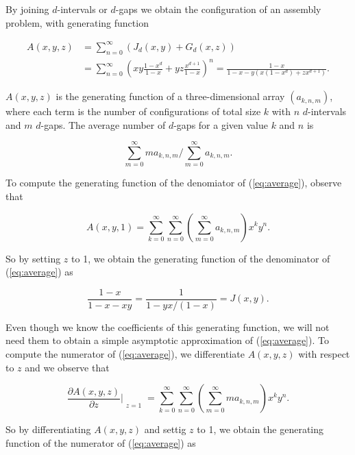 \documentclass{article}
\begin{document}
By joining $d$-intervals or $d$-gaps we obtain the configuration of an
assembly problem, with generating function

\begin{equation*}
\begin{split}
A(x,y,z) &= \sum_{n=0}^\infty \left(J_d(x,y) + G_d(x,z) \right) \\
&= \sum_{n=0}^\infty \left(xy\frac{1-x^d}{1-x} +
yz\frac{x^{d+1}}{1-x}\right)^n =
\frac{1-x}{1-x-y\left(x(1-x^d) +zx^{d+1}\right)}.
\end{split}
\end{equation*}

$A(x,y,z)$ is the generating function of a three-dimensional array
$(a_{k,n,m})$, where each term is the number of configurations of total
size $k$ with $n$ $d$-intervals and $m$ $d$-gaps. The average number of
$d$-gaps for a given value $k$ and $n$ is

\begin{equation}
\label{eq:average}
\sum_{m=0}^\infty ma_{k,n,m}\Big/\sum_{m=0}^\infty a_{k,n,m}.
\end{equation}

To compute the generating function of the denomiator of
(\ref{eq:average}), observe that

\begin{equation*}
A(x,y,1) = \sum_{k=0}^\infty\sum_{n=0}^\infty
\left(\sum_{m=0}^\infty a_{k,n,m}\right) x^ky^n.
\end{equation*}

So by setting $z$ to 1, we obtain the generating function of the
denominator of (\ref{eq:average}) as

\begin{equation*}
\frac{1-x}{1-x-xy} = \frac{1}{1-yx/(1-x)} = J(x,y).
\end{equation*}

Even though we know the coefficients of this generating function, we will
not need them to obtain a simple asymptotic approximation of
(\ref{eq:average}). To compute the numerator of (\ref{eq:average}), we
differentiate $A(x,y,z)$ with respect to $z$ and we observe that

\begin{equation*}
\frac{\partial A(x,y,z)}{\partial z}\Bigr|_{\substack{\\z=1}} =
\sum_{k=0}^\infty\sum_{n=0}^\infty
\left(\sum_{m=0}^\infty ma_{k,n,m}\right) x^ky^n.
\end{equation*}

So by differentiating $A(x,y,z)$ and settig $z$ to 1, we obtain the
generating function of the numerator of (\ref{eq:average}) as
\end{document}
